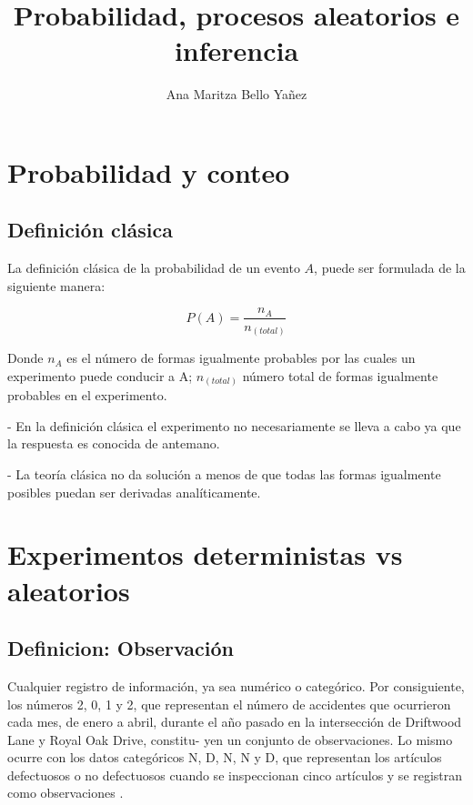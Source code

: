 \documentclass{article}
\begin{document}
\title{Probabilidad, procesos aleatorios e inferencia}
\author{Ana Maritza Bello Yañez}
\maketitle

\tableofcontents

\section{Probabilidad y conteo}

\subsection{Definición clásica \cite{faber2012statistics}}

La definición clásica de la probabilidad de un evento $A$, puede ser formulada
de la siguiente manera:

\begin{equation}
    P(A)= \frac{n_A}{n_(total)}
\end{equation}

Donde $n_A$ es el número de formas igualmente probables por las cuales un
experimento puede conducir a A; $n_(total)$ número total de formas igualmente
probables en el experimento.

- En la definición clásica el experimento no necesariamente se lleva a cabo ya que
la respuesta es conocida de antemano.

- La teoría clásica no da solución a menos de que todas las formas igualmente
posibles puedan ser derivadas analíticamente.

\section{Experimentos deterministas vs aleatorios}

\subsection{Definicion: Observación}

Cualquier registro de información, ya sea numérico o categórico. Por
consiguiente, los números 2, 0, 1 y 2, que representan el número de accidentes
que ocurrieron cada mes, de enero a abril, durante el año pasado en la
intersección de Driftwood Lane y Royal Oak Drive, constitu- yen un conjunto de
observaciones. Lo mismo ocurre con los datos categóricos N, D, N, N y D, que
representan los artículos defectuosos o no defectuosos cuando se inspeccionan
cinco artículos y se registran como observaciones \cite{walpole2012probabilidad}.
\end{document}
